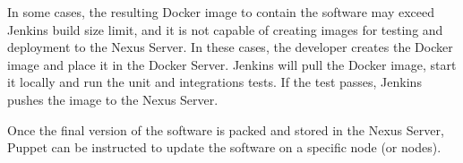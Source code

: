 In some cases, the resulting Docker image to contain the software may exceed Jenkins build size limit, and it is not capable of creating images for testing and deployment to the Nexus Server. In these cases, the developer creates the Docker image and place it in the Docker Server. Jenkins will pull the Docker image, start it locally and run the unit and integrations tests. If the test passes, Jenkins pushes the image to the Nexus Server.

Once the final version of the software is packed and stored in the Nexus Server, Puppet can be instructed to update the software on a specific node (or nodes). 















